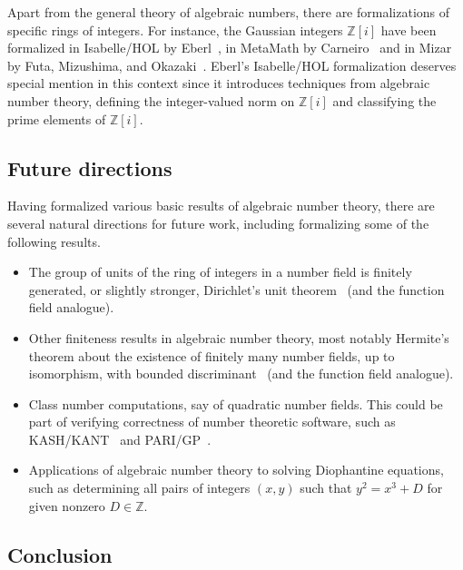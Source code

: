 \documentclass[a4paper,USenglish,cleveref, autoref, thm-restate]{lipics-v2021}
\newcommand{\Z}{\mathbb{Z}}
\begin{document}
Apart from the general theory of algebraic numbers, there are formalizations of specific rings of integers.
For instance, the Gaussian integers $\Z[i]$ have been formalized
in Isabelle/HOL by Eberl~\cite{gaussian_integers-isabelle},
in MetaMath by Carneiro~\cite{gaussian_integers-metamath}
and in Mizar by Futa, Mizushima, and Okazaki~\cite{gaussian_integers-mizar}.
Eberl's Isabelle/HOL formalization deserves special mention in this context since it introduces techniques from algebraic number theory,
defining the integer-valued norm on $\Z[i]$ and classifying the prime elements of $\Z[i]$.

\subsection{Future directions}

Having formalized various basic results of algebraic number theory, there are several natural directions for future work, including formalizing some of the following results.
\begin{itemize}

\item The group of units of the ring of integers in a number field is finitely generated, or slightly stronger, Dirichlet's unit theorem~\cite[Theorem 7.4]{Neukirch} (and the function field analogue).

\item Other finiteness results in algebraic number theory, most notably Hermite's theorem about the existence of finitely many number fields, up to isomorphism,
with bounded discriminant~\cite[Theorem 2.16]{Neukirch} (and the function field analogue).

\item Class number computations, say of quadratic number fields.
This could be part of verifying correctness of number theoretic software, such as KASH/KANT~\cite{kash} and PARI/GP~\cite{PARI2}.

\item Applications of algebraic number theory to solving Diophantine equations, such as determining all pairs of integers $(x,y)$ such that $y^2=x^3+D$ for
given nonzero $D \in \Z$.
\end{itemize}

\subsection{Conclusion}
\end{document}
